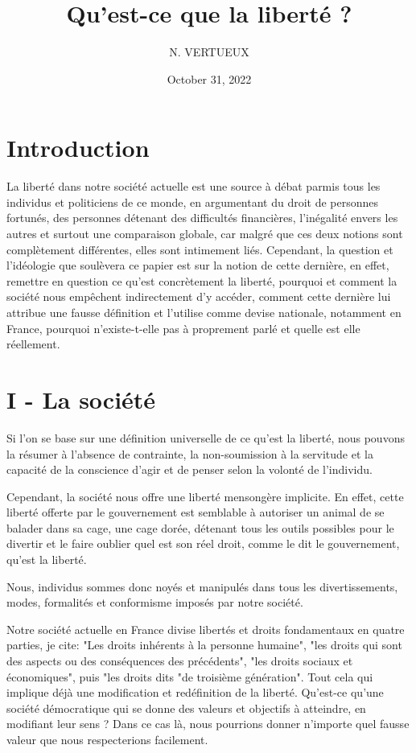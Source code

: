 \documentclass[]{liberty}
\begin{document}
\title{Qu'est-ce que la liberté ?}

\author{N. VERTUEUX}
\date{October 31, 2022}

\maketitle

\section{Introduction}
La liberté dans notre société actuelle est une source à débat parmis tous les individus
et politiciens de ce monde, en argumentant du droit de personnes fortunés, des personnes
détenant des difficultés financières, l'inégalité envers les autres et surtout une 
comparaison globale, car malgré que ces deux notions sont complètement différentes, elles
sont intimement liés. Cependant, la question et l'idéologie que soulèvera ce papier est 
sur la notion de cette dernière, en effet, remettre en question ce qu'est concrètement la 
liberté, pourquoi et comment la société nous empêchent indirectement d'y accéder, comment 
cette dernière lui attribue une fausse définition et l'utilise comme devise nationale, 
notamment en France, pourquoi n'existe-t-elle pas à proprement parlé et quelle est elle 
réellement. 

\section*{I - La société}
Si l'on se base sur une définition universelle de ce qu'est la liberté, nous pouvons la 
résumer à l'absence de contrainte, la non-soumission à la servitude et la capacité de la 
conscience d'agir et de penser selon la volonté de l'individu.\newline

Cependant, la société nous offre une liberté mensongère implicite. En effet, cette liberté 
offerte par le gouvernement est semblable à autoriser un animal de se balader dans sa cage, 
une cage dorée, détenant tous les outils possibles pour le divertir et le faire oublier quel 
est son réel droit, comme le dit le gouvernement, qu'est la liberté. 

Nous, individus sommes donc noyés et manipulés dans tous les divertissements, modes, 
formalités et conformisme imposés par notre société.\newline

Notre société actuelle en France divise libertés et droits fondamentaux en quatre parties, 
je cite: "Les droits inhérents à la personne humaine", "les droits qui sont des aspects ou 
des conséquences des précédents", "les droits sociaux et économiques", puis "les droits dits 
"de troisième génération". Tout cela qui implique déjà une modification et redéfinition de la 
liberté. Qu'est-ce qu'une société démocratique qui se donne des valeurs et objectifs à 
atteindre, en modifiant leur sens ? Dans ce cas là, nous pourrions donner n'importe quel 
fausse valeur que nous respecterions facilement.
\end{document}
